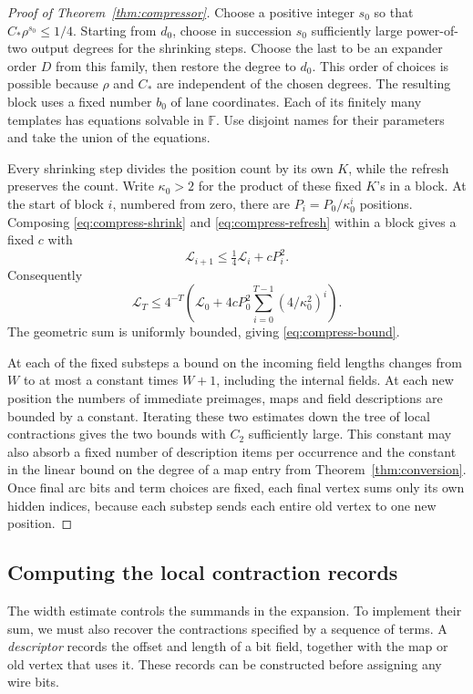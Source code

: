 \begin{proof}[Proof of Theorem~\ref{thm:compressor}]
Choose a positive integer $s_0$ so that $C_*\rho^{s_0}\le1/4$. Starting
from $d_0$, choose in succession $s_0$ sufficiently large power-of-two
output degrees for the shrinking steps. Choose the last to be an expander
order $D$ from this family, then restore the degree to
$d_0$. This order of choices is possible because $\rho$ and $C_*$ are
independent of the chosen degrees. The resulting block uses a fixed
number $b_0$ of lane coordinates. Each of its finitely many templates has
equations solvable in $\mathbb F$. Use disjoint names for their parameters and take
the union of the equations.

Every shrinking step divides the position count by its own $K$, while the
refresh preserves the count. Write $\kappa_0>2$ for the product of these
fixed $K$'s in a block. At the start of block $i$, numbered from zero,
there are $P_i=P_0/\kappa_0^i$ positions. Composing
\eqref{eq:compress-shrink} and \eqref{eq:compress-refresh} within a block
gives a fixed $c$ with
\[
          \mathcal L_{i+1}\le\tfrac14\mathcal L_i+cP_i^2 .
\]
Consequently
\[
   \mathcal L_T\le 4^{-T}
     \left(\mathcal L_0+4cP_0^2
                \sum_{i=0}^{T-1}(4/\kappa_0^2)^i\right).
\]
The geometric sum is uniformly bounded, giving \eqref{eq:compress-bound}.

At each of the fixed substeps a bound on the incoming field lengths changes
from $W$ to at most a constant times $W+1$, including the internal fields.
At each new position the numbers of immediate preimages, maps and field
descriptions are bounded by a constant. Iterating these two estimates down
the tree of local contractions gives the two bounds with $C_2$ sufficiently
large. This constant may also absorb a fixed number of description items per
occurrence and the constant in the linear bound on the degree of a map entry
from Theorem~\ref{thm:conversion}. Once final arc bits and term choices
are fixed, each final vertex sums only its own hidden indices, because each
substep sends each entire old vertex to one new position.
\end{proof}

\subsection{Computing the local contraction records}\label{app:descriptors}

The width estimate controls the summands in the expansion. To implement
their sum, we must also recover the contractions specified by a sequence
of terms. A \emph{descriptor} records the offset and length of a bit
field, together with the map or old vertex that uses it. These records
can be constructed before assigning any wire bits.

